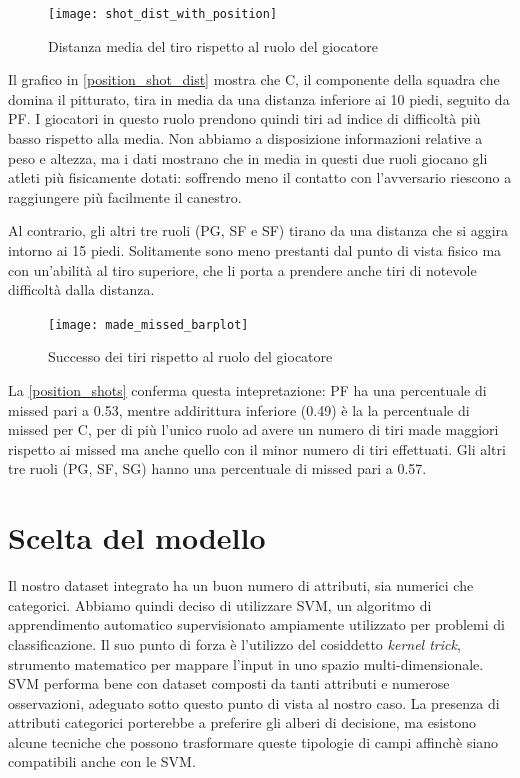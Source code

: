 \par

\begin{figure}
\caption{Distanza media del tiro rispetto al ruolo del giocatore}
\label{position_shot_dist}
\texttt{[image: shot\_dist\_with\_position]}
\end{figure}

Il grafico in \autoref{position_shot_dist} mostra che C, il componente della squadra che domina il pitturato, tira in media da una distanza inferiore ai 10 piedi, seguito da PF. I giocatori in questo ruolo prendono quindi tiri ad indice di difficoltà più basso rispetto alla media.
Non abbiamo a disposizione informazioni relative a peso e altezza, ma i dati \cite{basketball-reference} mostrano che in media in questi due ruoli giocano gli atleti più fisicamente dotati: soffrendo meno il contatto con l'avversario riescono a raggiungere più facilmente il canestro.

Al contrario, gli altri tre ruoli (PG, SF e SF) tirano da una distanza che si aggira intorno ai 15 piedi. Solitamente sono meno prestanti dal punto di vista fisico ma con un'abilità al tiro superiore, che li porta a prendere anche tiri di notevole difficoltà dalla distanza.

\begin{figure}
\caption{Successo dei tiri rispetto al ruolo del giocatore}
\label{position_shots}
\texttt{[image: made\_missed\_barplot]}
\end{figure}

La \autoref{position_shots} conferma questa intepretazione: PF ha una percentuale di missed pari a 0.53, mentre addirittura inferiore (0.49) è la la percentuale di missed per C, per di più l'unico ruolo ad avere un numero di tiri made maggiori rispetto ai missed ma anche quello con il minor numero di tiri effettuati.
Gli altri tre ruoli (PG, SF, SG) hanno una percentuale di missed pari a 0.57.

\section{Scelta del modello}

Il nostro dataset integrato ha un buon numero di attributi, sia numerici che categorici.
Abbiamo quindi deciso di utilizzare SVM, un algoritmo di apprendimento automatico supervisionato ampiamente utilizzato per problemi di classificazione. Il suo punto di forza è l'utilizzo del cosiddetto \textit{kernel trick}, strumento matematico per mappare l'input in uno spazio multi-dimensionale. SVM performa bene con dataset composti da tanti attributi e numerose osservazioni, adeguato sotto questo punto di vista al nostro caso.
La presenza di attributi categorici porterebbe a preferire gli alberi di decisione, ma esistono alcune tecniche che possono trasformare queste tipologie di campi affinchè siano compatibili anche con le SVM.